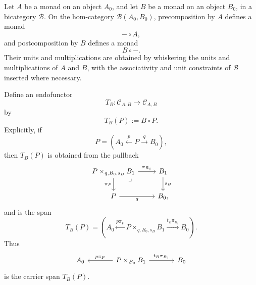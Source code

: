 \begin{lemma}
\label{lem:local-monads-induced-by-endpoint-monads}
    Let \(A\) be a monad on an object \(A_0\), and let \(B\) be a monad on an object \(B_0\), in a bicategory \(\mathcal B\). On the hom-category \(\mathcal B(A_0,B_0)\), precomposition by \(A\) defines a monad
    \[
        -\circ A,
    \]
    and postcomposition by \(B\) defines a monad
    \[
        B\circ -.
    \]
    Their units and multiplications are obtained by whiskering the units and multiplications of \(A\) and \(B\), with the associativity and unit constraints of \(\mathcal B\) inserted where necessary.
\end{lemma}

\begin{definition}
\label{def:output-comparison-endofunctor}
    Define an endofunctor
    \[
        T_B:\mathcal C_{A,B}\to\mathcal C_{A,B}
    \]
    by
    \[
        T_B(P):=B\circ P.
    \]
    Explicitly, if
    \[
        P=
        \left(
            A_0
            \xleftarrow{p}
            P
            \xrightarrow{q}
            B_0
        \right),
    \]
    then \(T_B(P)\) is obtained from the pullback
    \[
        \begin{tikzcd}
                P\times_{q,B_0,s_B}B_1
                    \arrow[r, "\pi_{B_1}"]
                    \arrow[d, "\pi_P"']
                    \arrow[dr, phantom, "\lrcorner", very near start]
            &
                B_1 
                    \arrow[d, "s_B"]
            \\
                P 
                    \arrow[r, "q"']
            &
                B_0,
        \end{tikzcd}
    \]
    and is the span
    \[
        T_B(P)
        =
        \left(
            A_0
            \xleftarrow{p\pi_P}
            P\times_{q,B_0,s_B}B_1
            \xrightarrow{t_B\pi_{B_1}}
            B_0
        \right).
    \]
    Thus
    \[
        \begin{tikzcd}[column sep=large]
                A_0
            &
                P\times_{B_0}B_1
                    \arrow[l, "p\pi_P"']
                    \arrow[r, "t_B\pi_{B_1}"]
            &
                B_0
        \end{tikzcd}
    \]
    is the carrier span \(T_B(P)\).


\end{definition}
